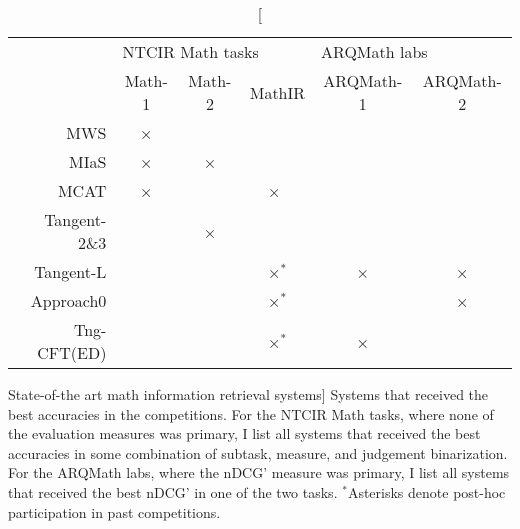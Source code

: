 \begin{table}
\centering
\begin{tabular}{@{}rccccc@{}}
\toprule
             & \multicolumn{3}{l}{NTCIR Math tasks} & \multicolumn{2}{l}{ARQMath labs} \\
             & Math-1 & Math-2 & MathIR             & ARQMath-1 & ARQMath-2            \\
\midrule
MWS          &    ×   &        &                    &           &                      \\
MIaS         &    ×   &    ×   &                    &           &                      \\
MCAT         &    ×   &        &    ×$\phantom{^{\text{*}}}$ &  &                      \\
Tangent-2\&3 &        &    ×   &                    &           &                      \\
Tangent-L    &        &        &    ×$^{\text{*}}$  &    ×      &     ×                \\
Approach0    &        &        &    ×$^{\text{*}}$  &           &     ×                \\
Tng-CFT(ED)  &        &        &    ×$^{\text{*}}$  &    ×      &                      \\
\bottomrule
\end{tabular}
\caption
  [State-of-the art math information retrieval systems]%
  {Systems that received the best accuracies in the competitions.
   For the NTCIR Math tasks, where none of the evaluation measures was
   primary, I list all systems that received the best accuracies in some
   combination of subtask, measure, and judgement binarization. For the ARQMath
   labs, where the nDCG' measure was primary, I list all systems that received
   the best nDCG' in one of the two tasks. $^{\text{*}}$Asterisks denote
   post-hoc participation in past competitions.}
\protect{}
\protect{}
\label{tab:systems}
\end{table}
